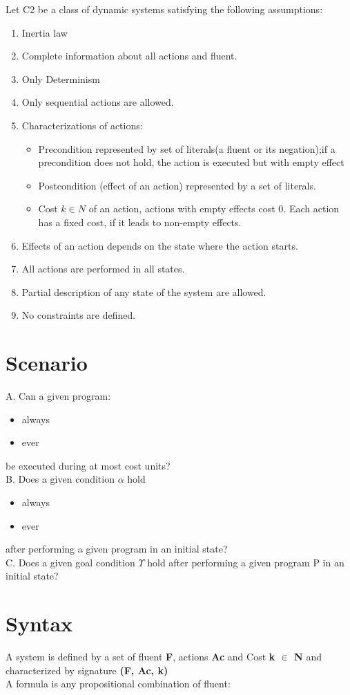\documentclass[11pt]{article}
\begin{document}
	Let C2 be a class of dynamic systems satisfying the following assumptions:
	\begin{enumerate}
		\item Inertia law
		\item Complete information about all actions and fluent. 
		\item Only Determinism
		\item Only sequential actions are allowed.
		\item Characterizations of actions:\begin{itemize}
			\item Precondition represented by set of literals(a fluent or its negation);if a precondition does not hold, the action is executed but with empty effect
			\item Postcondition (effect of an action) represented by a set of literals.
			\item Cost $k \in N $ of an action, actions with empty effects cost 0. Each action has a fixed cost, if it leads to non-empty effects. 
		\end{itemize}
		\item Effects of an action depends on the state where the action starts.
		\item All actions are performed in all states.
		\item Partial description of any state of the system are allowed.
		\item No constraints are defined.	 
	\end{enumerate}
	\section{Scenario}\label{sec:scenario}
	A. Can a given program:
	\begin{itemize}
		\item always
		\item ever
	\end{itemize} 
	be executed during at most cost units? \\
	B. Does a given condition \(\alpha\) hold 
	\begin{itemize}
		\item always
		\item ever
	\end{itemize}
	after performing a given program in an initial state?\\ 
	C. Does a given goal condition $\Upsilon$ hold after performing a given program P in an initial state?
	\section{Syntax}\label{sec:syntax}
	A system is defined by a set of fluent {\bfseries F}, actions {\bfseries Ac} and Cost {\bfseries k \(\in\) N} and characterized by signature {\bfseries(F, Ac, k)}\\
	A formula is any propositional combination of fluent:
	
\end{document}
